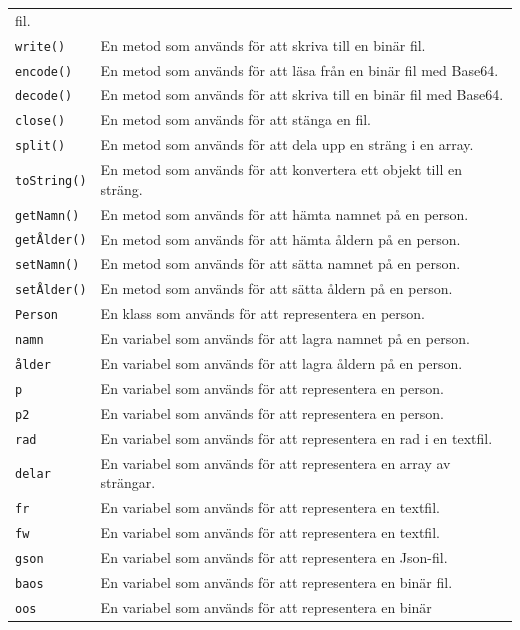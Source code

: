 \begin{longtable}[]{@{}
  >{\raggedright\arraybackslash}p{}
  >{\raggedright\arraybackslash}p{}@{}}
fil. \\
\texttt{write()} & En metod som används för att skriva till en binär
fil. \\
\texttt{encode()} & En metod som används för att läsa från en binär fil
med Base64. \\
\texttt{decode()} & En metod som används för att skriva till en binär
fil med Base64. \\
\texttt{close()} & En metod som används för att stänga en fil. \\
\texttt{split()} & En metod som används för att dela upp en sträng i en
array. \\
\texttt{toString()} & En metod som används för att konvertera ett objekt
till en sträng. \\
\texttt{getNamn()} & En metod som används för att hämta namnet på en
person. \\
\texttt{getÅlder()} & En metod som används för att hämta åldern på en
person. \\
\texttt{setNamn()} & En metod som används för att sätta namnet på en
person. \\
\texttt{setÅlder()} & En metod som används för att sätta åldern på en
person. \\
\texttt{Person} & En klass som används för att representera en
person. \\
\texttt{namn} & En variabel som används för att lagra namnet på en
person. \\
\texttt{ålder} & En variabel som används för att lagra åldern på en
person. \\
\texttt{p} & En variabel som används för att representera en person. \\
\texttt{p2} & En variabel som används för att representera en person. \\
\texttt{rad} & En variabel som används för att representera en rad i en
textfil. \\
\texttt{delar} & En variabel som används för att representera en array
av strängar. \\
\texttt{fr} & En variabel som används för att representera en
textfil. \\
\texttt{fw} & En variabel som används för att representera en
textfil. \\
\texttt{gson} & En variabel som används för att representera en
Json-fil. \\
\texttt{baos} & En variabel som används för att representera en binär
fil. \\
\texttt{oos} & En variabel som används för att representera en binär

\end{longtable}
